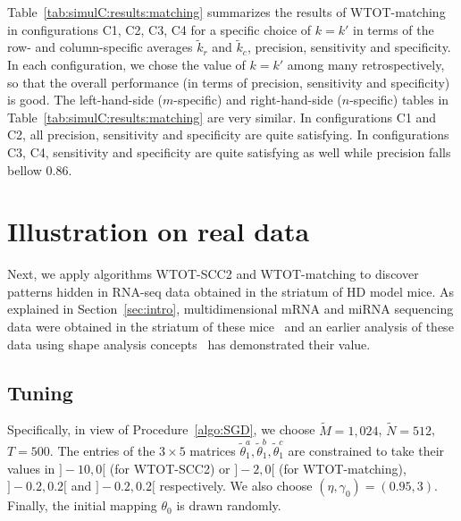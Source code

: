 \begin{description}
  Table~\ref{tab:simulC:results:matching}    summarizes    the   results    of
  WTOT-matching in  configurations C1,  C2, C3,  C4 for  a specific  choice of
  $k=k'$ in terms  of the row- and column-specific  averages $\tilde{k}_r$ and
  $\tilde{k}_c$,   precision,   sensitivity    and   specificity.    In   each
  configuration, we chose  the value of $k=k'$ among  many retrospectively, so
  that  the  overall  performance  (in terms  of  precision,  sensitivity  and
  specificity) is good.  The left-hand-side ($m$-specific) and right-hand-side
  ($n$-specific)  tables in  Table~\ref{tab:simulC:results:matching} are  very
  similar.   In  configurations C1  and  C2,  all precision,  sensitivity  and
  specificity are quite satisfying.  In configurations C3, C4, sensitivity and
  specificity are quite satisfying as well while precision falls bellow 0.86.
\end{description}

\section{Illustration  on   real  data}
\label{sec:real:data}

Next, we  apply algorithms  WTOT-SCC2 and  WTOT-matching to  discover patterns
hidden  in  RNA-seq data  obtained  in  the striatum  of  HD  model mice.   As
explained   in  Section~\ref{sec:intro},   multidimensional  mRNA   and  miRNA
sequencing    data    were    obtained    in    the    striatum    of    these
mice~\cite{Langfelder2016, Langfelder2018}  and an  earlier analysis  of these
data   using   shape   analysis   concepts~\cite{megret:inserm-02512089}   has
demonstrated their value.  %

\subsection{Tuning}
\label{subsec:tuning}

Specifically,    in    view    of    Procedure~\ref{algo:SGD},    we    choose
$\widetilde{M} = 1,024$,  $\widetilde{N}=512$, $T = 500$.  The  entries of the
$3\times                              5$                              matrices
$\tilde{\theta}_{1}^{a},  \tilde{\theta}_{1}^{b}, \tilde{\theta}_{1}^{c}$  are
constrained to  take their values  in $]-10,0[$  (for WTOT-SCC2) or  $]-2, 0[$
(for  WTOT-matching), $]-0.2,0.2[$  and  $]-0.2,0.2[$  respectively.  We  also
choose  $(\eta,  \gamma_{0})  =  (0.95, 3)$.   Finally,  the  initial  mapping
$\theta_{0}$ is drawn randomly.

